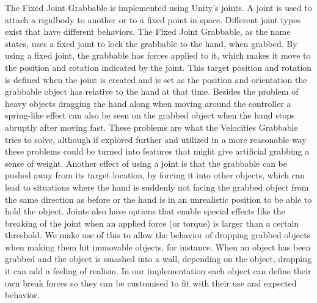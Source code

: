 The Fixed Joint Grabbable is implemented using Unity's joints. A joint is used to attach a rigidbody to another or to a fixed point in space. Different joint types exist that have different behaviors. The Fixed Joint Grabbable, as the name states, uses a fixed joint to lock the grabbable to the hand, when grabbed. By using a fixed joint, the grabbable has forces applied to it, which makes it move to the position and rotation indicated by the joint. This target position and rotation is defined when the joint is created and is set as the position and orientation the grabbable object has relative to the hand at that time. Besides the problem of heavy objects dragging the hand along when moving around the controller a spring-like effect can also be seen on the grabbed object when the hand stops abruptly after moving fast. These problems are what the Velocities Grabbable tries to solve, although if explored further and utilized in a more reasonable way these problems could be turned into features that might give artificial grabbing a sense of weight. Another effect of using a joint is that the grabbable can be pushed away from its target location, by forcing it into other objects, which can lead to situations where the hand is suddenly not facing the grabbed object from the same direction as before or the hand is in an unrealistic position to be able to hold the object.  Joints also have options that enable special effects like the breaking of the joint when an applied force (or torque) is larger than a certain threshold. We make use of this to allow the behavior of dropping grabbed objects when making them hit immovable objects, for instance. When an object has been grabbed and the object is smashed into a wall, depending on the object, dropping it can add a feeling of realism. In our implementation each object can define their own break forces so they can be customised to fit with their use and expected behavior.

